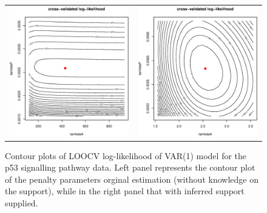 \begin{figure}[h!]
\centering
\begin{tabular}{cc}
\includegraphics[scale=0.3]{contourPlot_nonSparse.eps}
&
\includegraphics[scale=0.3]{contourPlot_sparse.eps}
\end{tabular}
\caption{Contour plots of LOOCV log-likelihood of VAR(1) model for the p53 signalling pathway data. Left panel represents the contour plot of the penalty parameters orginal estimation (without knowledge on the support), while in the right panel that with inferred support supplied.}
\label{figSM:contour}
\end{figure}

